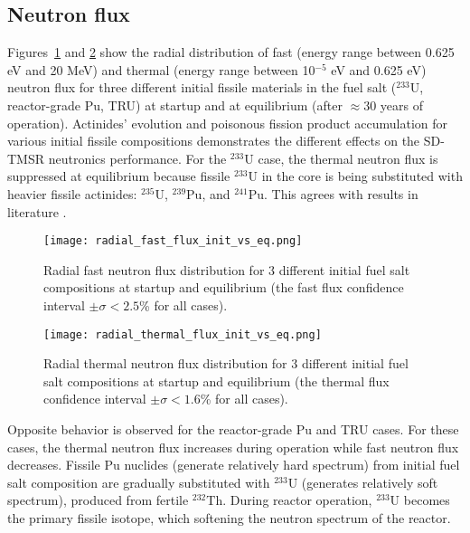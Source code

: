 \subsection{Neutron flux}
Figures~\ref{fig:fast_flux} and \ref{fig:thermal_flux} show the radial 
distribution of fast (energy range between 0.625 eV and 20 MeV) and thermal 
(energy range between 10$^{-5}$ eV and 0.625 eV) neutron flux for three 
different initial fissile materials in the fuel salt ($^{233}$U, reactor-grade 
Pu, TRU) at startup and at equilibrium (after $\approx 30$ years of 
operation). Actinides' evolution and poisonous fission product accumulation 
for various initial fissile compositions demonstrates the different effects on 
the SD-TMSR neutronics performance. For the $^{233}$U case, the thermal 
neutron flux is suppressed at equilibrium because fissile $^{233}$U in the 
core is being substituted with heavier fissile actinides: $^{235}$U, 
$^{239}$Pu, and $^{241}$Pu. This agrees with results in literature 
\cite{rykhlevskii2019modeling, ashraf2019whole_core}.
\begin{figure}[htp!] %
	\texttt{[image: radial\_fast\_flux\_init\_vs\_eq.png]} 
	\caption{Radial fast neutron flux distribution for 3 different initial 
		fuel salt compositions at startup and equilibrium (the fast flux 
		confidence interval $\pm\sigma<2.5$\% for all cases).}
	\label{fig:fast_flux}
\end{figure}
\begin{figure}[htp!] %
	\texttt{[image: radial\_thermal\_flux\_init\_vs\_eq.png]} 
	\caption{Radial thermal neutron flux distribution for 3 different initial 
		fuel salt compositions at startup and equilibrium (the thermal flux 
		confidence interval $\pm\sigma<1.6$\% for all cases).}
	\label{fig:thermal_flux}
\end{figure}

Opposite behavior is observed for the reactor-grade Pu and TRU cases. For  
these cases, the thermal neutron flux increases during operation while fast 
neutron flux decreases. Fissile Pu nuclides (generate relatively hard 
spectrum) from initial fuel salt composition are gradually substituted with  
$^{233}$U (generates relatively soft spectrum), produced from fertile 
$^{232}$Th. During reactor operation, $^{233}$U becomes the primary fissile 
isotope, which softening the neutron spectrum of the reactor. 

